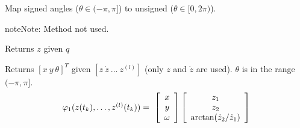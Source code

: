 \documentclass[letterpaper,10pt,english]{sphinxmanual}
\begin{document}
\begin{fulllineitems}
\begin{fulllineitems}
\label{Multi-robot motion planner:planning_sim.UnicycleKineModel._unsigned_angle}
Map signed angles (\(\theta \in (-\pi, \pi]\)) to unsigned
(\(\theta \in [0, 2\pi)\)).

\begin{notice}{note}{Note:}
Method not used.
\end{notice}

\end{fulllineitems}


\begin{fulllineitems}
\label{Multi-robot motion planner:planning_sim.UnicycleKineModel.phi_0}
Returns \(z\) given \(q\)

\end{fulllineitems}


\begin{fulllineitems}
\label{Multi-robot motion planner:planning_sim.UnicycleKineModel.phi_1}
Returns \([x\ y\ \theta]^T\) given \([z\ \dot{z}\ \dotsc\ z^{(l)}]\)
(only \(z\) and \(\dot{z}\) are used). \(\theta\) is in the range
\((-\pi, \pi]\).
\begin{gather}
\begin{split}\begin{array}{l}
\varphi_1(z(t_k),\dotsc,z^{(l)}(t_k))=\
\left[\begin{array}{c}
x\\
y\\
\omega
\end{array}\right]
\left[\begin{array}{c}
z_1\\
z_2\\
\arctan(\dot{z}_2/\dot{z}_1)\\
\end{array}\right]
\end{array}\end{split}\notag
\end{gather}
\end{fulllineitems}



\end{fulllineitems}
\end{document}
